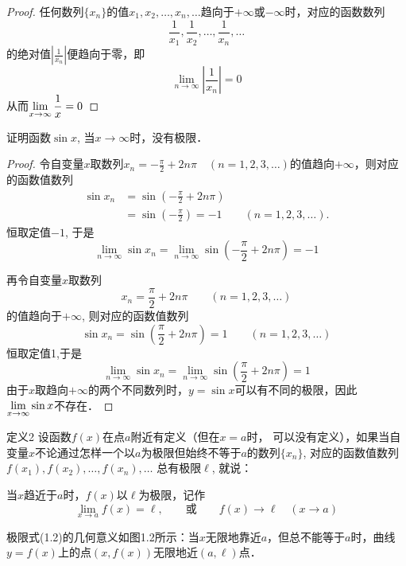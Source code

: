 \begin{proof}
任何数列$\{x_n\}$的值$x_1,x_2,\ldots,x_n,\ldots$趋向于$+\infty$或$-\infty$时，对应的函数数列
\[\frac{1}{x_1},\frac{1}{x_2},\ldots, \frac{1}{x_n},\ldots\]
的绝对值$\left|\frac{1}{x_n}\right|$便趋向于零，即
    \[\lim_{n\to\infty}\left|\frac{1}{x_n}\right|=0\]
    从而$\displaystyle\lim_{x\to\infty}\dfrac{1}{x}=0$
\end{proof}

\begin{example}
证明函数$\sin x$, 当$x\to\infty$时，没有极限．
\end{example}

\begin{proof}
令自变量$x$取数列$x_n=-\frac{\pi}{2}+2n\pi\quad (n=1,2,3,\ldots)$的值趋向$+\infty$，则对应的函数值数列
\[\begin{split}
    \sin x_n&=\sin\left(-\frac{\pi}{2}+2n\pi\right)\\
&=\sin\left(-\frac{\pi}{2}\right) =-1 \qquad (n=1, 2, 3, \ldots) .
\end{split}\]
恒取定值$-1$, 于是
\[\lim_{n\to\infty} \sin x_n=\lim_{n\to\infty} \sin \left(-\frac{\pi}{2}+2n\pi\right)=-1\]

再令自变量$x$取数列
\[x_n=\frac{\pi}{2}+2n\pi\qquad  (n=1, 2, 3, \ldots )\]
的值趋向于$+\infty$, 则对应的函数值数列
\[\sin x_n =\sin\left(\frac{\pi}{2}+2n\pi\right) =1\qquad  (n=1, 2, 3, \ldots)\]
恒取定值1,于是
\[\lim_{n\to\infty} \sin x_n=\lim_{n\to\infty} \sin\left(\frac{\pi}{2}+2n\pi\right) =1\]
由于$x$取趋向$+\infty$的两个不同数列时，$y=\sin x$可以有不同的极限，因此
$\displaystyle\lim_{x\to\infty} \sin x$不存在．
\end{proof}

\begin{blk}{定义2}
 设函数$f(x)$在点$a$附近有定义（但在$x=a$时，
可以没有定义），如果当自变量$x$不论通过怎样一个以$a$为极限但始终不等于$a$的数列$\{x_n\}$, 对应的函数值数列$f (x_1) ,f (x_2) , \ldots,f(x_n ) ,\ldots$
总有极限$\ell$, 就说：

当$x$趋近于$a$时，$f(x)$以$\ell$为极限，记作
\begin{equation}
   \lim_{x\to a}f(x)=\ell,\qquad \text{或}\qquad f(x)\to \ell\quad (x\to a) 
\end{equation}
\end{blk}

极限式(1.2)的几何意义如图1.2所示：当$x$无限地靠近$a$，但总不能等于$a$时，曲线$y=f(x)$上的点$(x,f(x))$无限地近$(a,\ell)$点．

\begin{figure}[htp]
    \centering
{}
    \caption{}
\end{figure}

